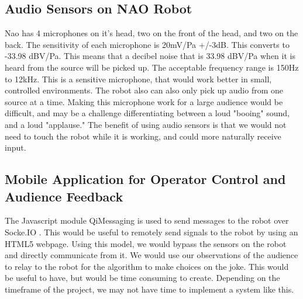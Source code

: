 \documentclass[onecolumn, draftclsnofoot,10pt, compsoc]{IEEEtran}
\begin{document}
  \subsection{Audio Sensors on NAO Robot}
    Nao has 4 microphones on it's head, two on the front of the head, and two on the back. The sensitivity of each microphone is 20mV/Pa +/-3dB. This converts to -33.98 dBV/Pa. This means that a decibel noise that is 33.98 dBV/Pa when it is heard from the source will be picked up. The acceptable frequency range is 150Hz to 12kHz. This is a sensitive microphone, that would work better in small, controlled environments. The robot also can also only pick up audio from one source at a time. Making this microphone work for a large audience would be difficult, and may be a challenge differentiating between a loud "booing" sound, and a loud "applause." The benefit of using audio sensors is that we would not need to touch the robot while it is working, and could more naturally receive input.
  \subsection{Mobile Application for Operator Control and Audience Feedback}

  The Javascript module QiMessaging \cite{qimessagingjavascript} is used to send messages to the robot over Socke.IO \cite{socketIO}. This would be useful to remotely send signals to the robot by using an HTML5 webpage. Using this model, we would bypass the sensors on the robot and directly communicate from it. We would use our observations of the audience to relay to the robot for the algorithm to make choices on the joke. This would be useful to have, but would be time consuming to create. Depending on the timeframe of the project, we may not have time to implement a system like this.

\pagebreak




\end{document}
